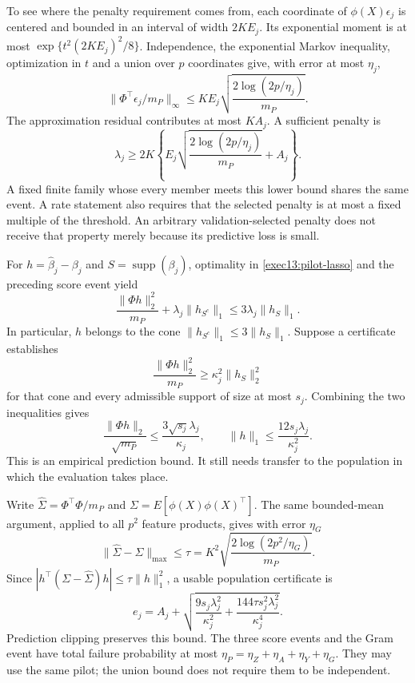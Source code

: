 To see where the penalty requirement comes from, each coordinate of
$\phi(X)\epsilon_j$ is centered and bounded in an interval of width $2KE_j$.
Its exponential moment is at most
$\exp\{t^2(2KE_j)^2/8\}$. Independence, the exponential Markov inequality,
optimization in $t$ and a union over $p$ coordinates give, with error at most
$\eta_j$,
\begin{equation}
 \|\Phi^\top\epsilon_j/m_P\|_\infty
 \le KE_j\sqrt{\frac{2\log(2p/\eta_j)}{m_P}}.
\end{equation}
The approximation residual contributes at most $KA_j$. A sufficient penalty is
\begin{equation}
 \lambda_j\ge2K\left\{E_j\sqrt{\frac{2\log(2p/\eta_j)}{m_P}}+A_j\right\}.
 \label{exec13:pilot-penalty}
\end{equation}
A fixed finite family whose every member meets this lower bound shares the
same event. A rate statement also requires that the selected penalty is at most
a fixed multiple of the threshold. An arbitrary validation-selected penalty
does not receive that property merely because its predictive loss is small.

For $h=\widehat\beta_j-\beta_j$ and $S=\operatorname{supp}(\beta_j)$,
optimality in \eqref{exec13:pilot-lasso} and the preceding score event yield
\begin{equation}
 \frac{\|\Phi h\|_2^2}{m_P}+\lambda_j\|h_{S^c}\|_1
 \le3\lambda_j\|h_S\|_1.
 \label{exec13:pilot-basic}
\end{equation}
In particular, $h$ belongs to the cone
$\|h_{S^c}\|_1\le3\|h_S\|_1$. Suppose a certificate establishes
\begin{equation}
 \frac{\|\Phi h\|_2^2}{m_P}\ge\kappa_j^2\|h_S\|_2^2
 \label{exec13:pilot-cone}
\end{equation}
for that cone and every admissible support of size at most $s_j$. Combining
the two inequalities gives
\begin{equation}
 \frac{\|\Phi h\|_2}{\sqrt{m_P}}\le
 \frac{3\sqrt{s_j}\lambda_j}{\kappa_j},\qquad
 \|h\|_1\le\frac{12s_j\lambda_j}{\kappa_j^2}.
\end{equation}
This is an empirical prediction bound. It still needs transfer to the population
in which the evaluation takes place.

Write $\widehat\Sigma=\Phi^\top\Phi/m_P$ and
$\Sigma=E[\phi(X)\phi(X)^\top]$. The same bounded-mean argument, applied to
all $p^2$ feature products, gives with error $\eta_G$
\begin{equation}
 \|\widehat\Sigma-\Sigma\|_{\max}\le
 \tau=K^2\sqrt{\frac{2\log(2p^2/\eta_G)}{m_P}}.
\end{equation}
Since $|h^\top(\Sigma-\widehat\Sigma)h|\le\tau\|h\|_1^2$, a usable
population certificate is
\begin{equation}
 e_j=A_j+
 \sqrt{\frac{9s_j\lambda_j^2}{\kappa_j^2}
       +\frac{144\tau s_j^2\lambda_j^2}{\kappa_j^4}}.
 \label{exec13:pilot-certificate}
\end{equation}
Prediction clipping preserves this bound. The three score events and the Gram
event have total failure probability at most
$\eta_P=\eta_Z+\eta_A+\eta_Y+\eta_G$. They may use the same pilot;
the union bound does not require them to be independent.

